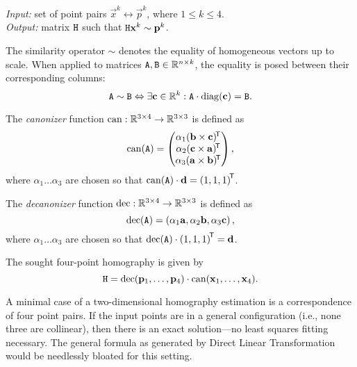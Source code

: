 \textit{Input:} set of point pairs $\vec x^k \leftrightarrow \vec p^k$, where $1 \leq k \leq 4$.\\
\textit{Output:} matrix $\mathtt{H}$ such that $\mathtt{H} \mathbf{x}^k \sim \mathbf{p}^k$.\\

\begin{definition}
The similarity operator $\sim$ denotes the equality of homogeneous vectors up to scale.
When applied to matrices $\mathtt{A}, \mathtt{B} \in \mathbb{R}^{n \times k}$, the equality is posed between their corresponding columns:
$$
\mathtt{A} \sim \mathtt{B} \Leftrightarrow \exists \mathbf{c} \in \mathbb{R}^k : \mathtt{A} \cdot \mathrm{diag}(\mathbf{c}) = \mathtt{B}.
$$
\end{definition}

\begin{definition}
The \textit{canonizer} function $\mathrm{can}: \mathbb{R}^{3\times 4} \to \mathbb{R}^{3\times 3}$ is defined as
$$\mathrm{can}(\mathtt{A}) = \begin{pmatrix}
 \alpha_1 (\mathbf{b} \times \mathbf{c}) ^{\!\mathsf{T}} \\
 \alpha_2 (\mathbf{c} \times \mathbf{a}) ^{\!\mathsf{T}} \\
 \alpha_3 (\mathbf{a} \times \mathbf{b}) ^{\!\mathsf{T}} \\
 \end{pmatrix},
$$
where $\alpha_1 \dots \alpha_3$ are chosen so that $\mathrm{can}(\mathtt{A}) \cdot \mathbf{d} = \left( 1, 1, 1 \right)^{\!\mathsf{T}}$.
\end{definition}

\begin{definition}
The \textit{decanonizer} function $\mathrm{dec}: \mathbb{R}^{3\times 4} \to \mathbb{R}^{3\times 3}$ is defined as
$$\mathrm{dec}(\mathtt{A}) = \left( \alpha_1 \mathbf{a}, \alpha_2 \mathbf{b}, \alpha_3 \mathbf{c} \right),$$
where $\alpha_1 \dots \alpha_3$ are chosen so that $\mathrm{dec}(\mathtt{A}) \cdot \left( 1, 1, 1 \right)^{\!\mathsf{T}} = \mathbf{d}$.
\end{definition}

The sought four-point homography is given by
\begin{equation} \label{e:algo-homo}
\mathtt{H} = \mathrm{dec}(\mathbf{p}_1, \dots, \mathbf{p}_4) \cdot \mathrm{can}(\mathbf{x}_1, \dots, \mathbf{x}_4).
\end{equation}

A minimal case of a two-dimensional homography estimation is a correspondence of four point pairs.
If the input points are in a general configuration (i.e., none three are collinear), then there is an exact solution---no least squares fitting necessary.
The general formula as generated by Direct Linear Transformation would be needlessly bloated for this setting.


